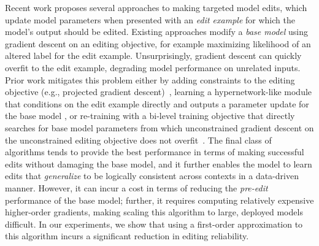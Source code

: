 Recent work proposes several approaches to making targeted model edits, which update model parameters when presented with an \textit{edit example} for which the model's output should be edited. Existing approaches modify a \textit{base model} using gradient descent on an editing objective, for example maximizing likelihood of an altered label for the edit example. Unsurprisingly, gradient descent can quickly overfit to the edit example, degrading model performance on unrelated inputs. Prior work mitigates this problem either by adding constraints to the editing objective (e.g., projected gradient descent)~\citep{zhu2020modifying,Sotoudeh2021ProvableRO}, learning a hypernetwork-like module that conditions on the edit example directly and outputs a parameter update for the base model \citep{Cao2021EditingFK}, or re-training with a bi-level training objective that directly searches for base model parameters from which unconstrained gradient descent on the unconstrained editing objective does not overfit~\citep{Sinitsin2020Editable}. The final class of algorithms tends to provide the best performance in terms of making successful edits without damaging the base model, and it further enables the model to learn edits that \textit{generalize} to be logically consistent across contexts in a data-driven manner. However, it can incur a cost in terms of reducing the \textit{pre-edit} performance of the base model; further, it requires computing relatively expensive higher-order gradients, making scaling this algorithm to large, deployed models difficult. In our experiments, we show that using a first-order approximation to this algorithm incurs a significant reduction in editing reliability.

